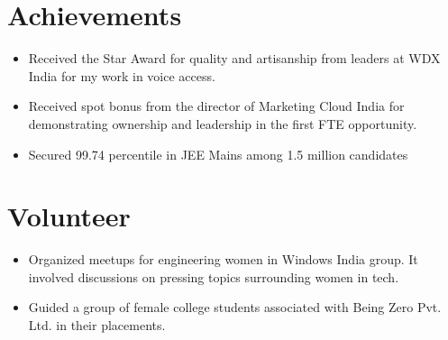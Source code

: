 \documentclass[letterpaper,11pt]{article}
\newcommand{\listItem}[1]{
  \item\small{{#1 \vspace{-2pt}}
  }
}
\newcommand{\resumeSubHeadingListStart}{\begin{itemize}[leftmargin=*]}
\newcommand{\resumeSubHeadingListEnd}{\end{itemize}}
\newcommand{\resumeListItem}[1]{\listItem{#1}\vspace{-4pt}}
\begin{document}
\section{Achievements}
 \resumeSubHeadingListStart
   \resumeListItem
      {Received the Star Award for quality and artisanship from leaders at WDX India for my work in voice access.}
    \resumeListItem
      {Received spot bonus from the director of Marketing Cloud India for demonstrating ownership and leadership in the first FTE opportunity.}
    \resumeListItem
      {Secured 99.74 percentile in JEE Mains among 1.5 million candidates}
 \resumeSubHeadingListEnd
 
 
\section{Volunteer}
 \resumeSubHeadingListStart
   \resumeListItem
      {Organized meetups for engineering women in Windows India group. It involved discussions on pressing topics surrounding women in tech.}
    \resumeListItem
      {Guided a group of female college students associated with Being Zero Pvt. Ltd. in their placements.}
 \resumeSubHeadingListEnd
 
 
\end{document}
